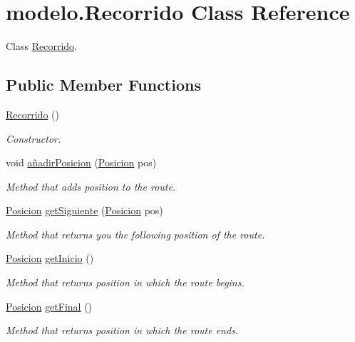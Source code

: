 \hypertarget{classmodelo_1_1_recorrido}{}\section{modelo.\+Recorrido Class Reference}
\label{classmodelo_1_1_recorrido}


Class \mbox{\hyperlink{classmodelo_1_1_recorrido}{Recorrido}}.  


\subsection*{Public Member Functions}
\begin{DoxyCompactItemize}
\item 
\mbox{\label{classmodelo_1_1_recorrido_a6cedcfdac885aad7b83bb1b5ffdf7261}} 
\mbox{\hyperlink{classmodelo_1_1_recorrido_a6cedcfdac885aad7b83bb1b5ffdf7261}{Recorrido}} ()
\begin{DoxyCompactList}\small\item\em Constructor. \end{DoxyCompactList}\item 
void \mbox{\hyperlink{classmodelo_1_1_recorrido_a898fb136038eb311de6ff6eaba592939}{añadir\+Posicion}} (\mbox{\hyperlink{classmodelo_1_1_posicion}{Posicion}} pos)
\begin{DoxyCompactList}\small\item\em Method that adds position to the route. \end{DoxyCompactList}\item 
\mbox{\hyperlink{classmodelo_1_1_posicion}{Posicion}} \mbox{\hyperlink{classmodelo_1_1_recorrido_a30ce3f0f577225221cca2ac099a6a6b6}{get\+Siguiente}} (\mbox{\hyperlink{classmodelo_1_1_posicion}{Posicion}} pos)
\begin{DoxyCompactList}\small\item\em Method that returns you the following position of the route. \end{DoxyCompactList}\item 
\mbox{\hyperlink{classmodelo_1_1_posicion}{Posicion}} \mbox{\hyperlink{classmodelo_1_1_recorrido_ace70d961807be77d6fec75142c2e630b}{get\+Inicio}} ()
\begin{DoxyCompactList}\small\item\em Method that returns position in which the route begins. \end{DoxyCompactList}\item 
\mbox{\hyperlink{classmodelo_1_1_posicion}{Posicion}} \mbox{\hyperlink{classmodelo_1_1_recorrido_a553b3ffc252f878460d5d6ed55ea61fb}{get\+Final}} ()
\begin{DoxyCompactList}\small\item\em Method that returns position in which the route ends. \end{DoxyCompactList}\end{DoxyCompactItemize}


